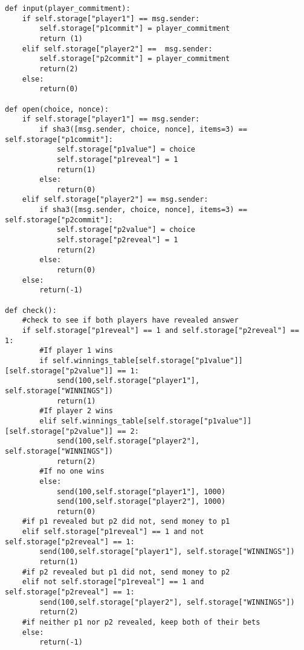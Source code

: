 \documentclass[10pt,twocolumn,letterpaper]{article}
\begin{document}
\begin{mdframed}
\begin{verbatim}
def input(player_commitment):
	if self.storage["player1"] == msg.sender:
		self.storage["p1commit"] = player_commitment
		return (1)
	elif self.storage["player2"] ==  msg.sender:
		self.storage["p2commit"] = player_commitment
		return(2)
	else:
		return(0)

def open(choice, nonce):
	if self.storage["player1"] == msg.sender:
		if sha3([msg.sender, choice, nonce], items=3) == self.storage["p1commit"]:
			self.storage["p1value"] = choice
			self.storage["p1reveal"] = 1
			return(1)
		else:
			return(0)
	elif self.storage["player2"] == msg.sender:
		if sha3([msg.sender, choice, nonce], items=3) == self.storage["p2commit"]:
			self.storage["p2value"] = choice
			self.storage["p2reveal"] = 1
			return(2)
		else:
			return(0)
	else:
		return(-1)

def check():
	#check to see if both players have revealed answer
	if self.storage["p1reveal"] == 1 and self.storage["p2reveal"] == 1:
		#If player 1 wins
		if self.winnings_table[self.storage["p1value"]][self.storage["p2value"]] == 1:
			send(100,self.storage["player1"], self.storage["WINNINGS"])
			return(1)
		#If player 2 wins
		elif self.winnings_table[self.storage["p1value"]][self.storage["p2value"]] == 2:
			send(100,self.storage["player2"], self.storage["WINNINGS"])
			return(2)
		#If no one wins
		else:
			send(100,self.storage["player1"], 1000)
			send(100,self.storage["player2"], 1000)
			return(0)
	#if p1 revealed but p2 did not, send money to p1
	elif self.storage["p1reveal"] == 1 and not self.storage["p2reveal"] == 1:
		send(100,self.storage["player1"], self.storage["WINNINGS"])
		return(1)
	#if p2 revealed but p1 did not, send money to p2
	elif not self.storage["p1reveal"] == 1 and self.storage["p2reveal"] == 1:
		send(100,self.storage["player2"], self.storage["WINNINGS"])
		return(2)
	#if neither p1 nor p2 revealed, keep both of their bets
	else:
		return(-1)
\end{verbatim}
\end{mdframed}
\end{document}
